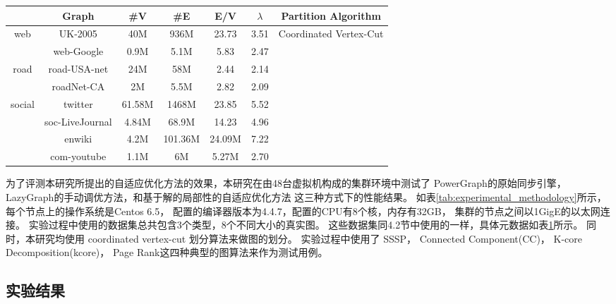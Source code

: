 \begin{table}[htb]
  \centering
  \label{tab:experimental_data_set_and_partition_algorithm}
    \begin{tabular}{ccccccc}
     \toprule[1.5pt]
     & \textbf{Graph} & \textbf{\#V} & \textbf{\#E} & \textbf{E/V} & \textbf{$\lambda$} & {\textbf{Partition Algorithm}} \\
     \midrule[1pt]
     \multirow{2}{*}{web} & UK-2005 & 40M & 936M & 23.73 & 3.51 & \multirow{8}{*}{Coordinated Vertex-Cut } \\
                                         & web-Google & 0.9M & 5.1M & 5.83 & 2.47 \\
     \cmidrule(lr){1-6}
      \multirow{2}{*}{road} & road-USA-net & 24M & 58M & 2.44 & 2.14 \\
                                          & roadNet-CA & 2M & 5.5M & 2.82 & 2.09 \\
      \cmidrule(lr){1-6}
      \multirow{4}{*}{social} & twitter & 61.58M & 1468M & 23.85 & 5.52 \\
                                          & soc-LiveJournal & 4.84M & 68.9M & 14.23 & 4.96 \\
                                          & enwiki & 4.2M & 101.36M & 24.09M & 7.22 \\
                                          & com-youtube & 1.1M & 6M & 5.27M & 2.70 \\
     \bottomrule[1.5pt]
    \end{tabular}
\end{table}

为了评测本研究所提出的自适应优化方法的效果，本研究在由48台虚拟机构成的集群环境中测试了
PowerGraph的原始同步引擎，LazyGraph的手动调优方法，和基于解的局部性的自适应优化方法
这三种方式下的性能结果。
如表\ref{tab:experimental_methodology}所示，每个节点上的操作系统是Centos 6.5，
配置的编译器版本为4.4.7，配置的CPU有8个核，内存有32GB，
集群的节点之间以1GigE的以太网连接。
实验过程中使用的数据集总共包含3个类型，8个不同大小的真实图。
这些数据集同4.2节中使用的一样，具体元数据如表\ref{tab:experimental_data_set_and_partition_algorithm}所示。
同时，本研究均使用 coordinated vertex-cut 划分算法来做图的划分。
实验过程中使用了
SSSP， 
Connected Component(CC)，
K-core Decomposition(kcore)， 
Page Rank这四种典型的图算法来作为测试用例。


\subsection{实验结果}

